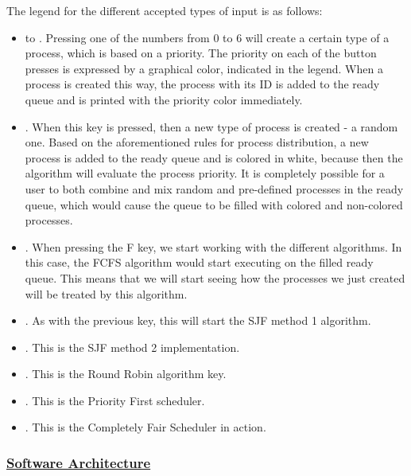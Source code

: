 \documentclass{article}
\newcommand{\code}[1]{\codeinline{\texttt{#1}}}
\begin{document}
The legend for the different accepted types of input is as follows:

\begin{itemize}
\item \code{0} to \code{6}. Pressing one of the numbers from 0 to 6 will create a certain type of a process, which is based on a priority. The priority on each of the button presses is expressed by a graphical color, indicated in the legend. When a process is created this way, the process with its ID is added to the ready queue and is printed with the priority color immediately.
\item \code{r}. When this key is pressed, then a new type of process is created - a random one. Based on the aforementioned rules for process distribution, a new process is added to the ready queue and is colored in white, because then the algorithm will evaluate the process priority. It is completely possible for a user to both combine and mix random and pre-defined processes in the ready queue, which would cause the queue to be filled with colored and non-colored processes.
\item \code{f}. When pressing the F key, we start working with the different algorithms. In this case, the FCFS algorithm would start executing on the filled ready queue. This means that we will start seeing how the processes we just created will be treated by this algorithm.
\item \code{h}. As with the previous key, this will start the SJF method 1 algorithm.
\item \code{s}. This is the SJF method 2 implementation.
\item \code{o}. This is the Round Robin algorithm key.
\item \code{p}. This is the Priority First scheduler.
\item \code{c}. This is the Completely Fair Scheduler in action.
\end{itemize}

\subsubsection{\underline{Software Architecture}}
\end{document}
